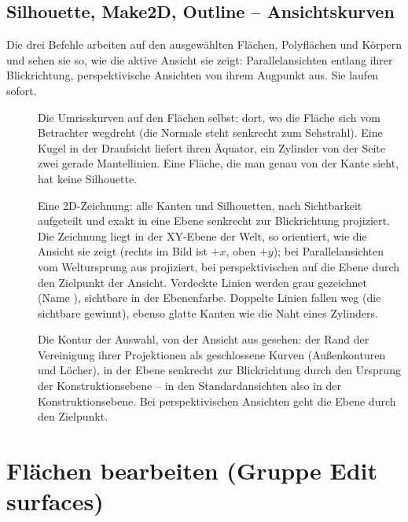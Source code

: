 \subsection{Silhouette, Make2D, Outline -- Ansichtskurven}\label{sec:cmd-silhouette}
Die drei Befehle arbeiten auf den ausgewählten Flächen, Polyflächen und Körpern und sehen sie so,
wie die aktive Ansicht sie zeigt: Parallelansichten entlang ihrer Blickrichtung, perspektivische
Ansichten von ihrem Augpunkt aus. Sie laufen sofort.
\begin{description}
\item[] Die Umrisskurven auf den Flächen selbst: dort, wo die Fläche sich vom
  Betrachter wegdreht (die Normale steht senkrecht zum Sehstrahl). Eine Kugel in der Draufsicht
  liefert ihren Äquator, ein Zylinder von der Seite zwei gerade Mantellinien. Eine Fläche, die man
  genau von der Kante sieht, hat keine Silhouette.
\item[] Eine 2D-Zeichnung: alle Kanten und Silhouetten, nach Sichtbarkeit aufgeteilt
  und exakt in eine Ebene senkrecht zur Blickrichtung projiziert. Die Zeichnung liegt in der
  XY-Ebene der Welt, so orientiert, wie die Ansicht sie zeigt (rechts im Bild ist $+x$, oben
  $+y$); bei Parallelansichten vom Weltursprung aus projiziert, bei perspektivischen auf die Ebene
  durch den Zielpunkt der Ansicht. Verdeckte Linien werden grau gezeichnet (Name ), sichtbare in der Ebenenfarbe. Doppelte Linien fallen weg (die sichtbare gewinnt),
  ebenso glatte Kanten wie die Naht eines Zylinders.
\item[] Die Kontur der Auswahl, von der Ansicht aus gesehen: der Rand der
  Vereinigung ihrer Projektionen als geschlossene Kurven (Außenkonturen und Löcher), in der Ebene
  senkrecht zur Blickrichtung durch den Ursprung der Konstruktionsebene -- in den Standardansichten
  also in der Konstruktionsebene. Bei perspektivischen Ansichten geht die Ebene durch den
  Zielpunkt.
\end{description}

\section{Flächen bearbeiten (Gruppe Edit surfaces)}\label{sec:gruppe-surface-edit}

